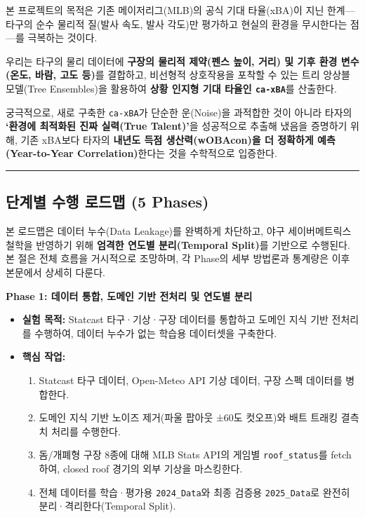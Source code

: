 \documentclass[
  11.5pt,
]{article}
\providecommand{\tightlist}{%
  \setlength{\itemsep}{0pt}\setlength{\parskip}{0pt}}
\begin{document}
본 프로젝트의 목적은 기존 메이저리그(MLB)의 공식 기대 타율(xBA)이 지닌
한계---타구의 순수 물리적 질(발사 속도, 발사 각도)만 평가하고 현실의
환경을 무시한다는 점---를 극복하는 것이다.

우리는 타구의 물리 데이터에 \textbf{구장의 물리적 제약(펜스 높이, 거리)
및 기후 환경 변수(온도, 바람, 고도 등)}를 결합하고, 비선형적 상호작용을
포착할 수 있는 트리 앙상블 모델(Tree Ensembles)을 활용하여 \textbf{상황
인지형 기대 타율인 \texttt{ca-xBA}}를 산출한다.

궁극적으로, 새로 구축한 \texttt{ca-xBA}가 단순한 운(Noise)을 과적합한
것이 아니라 타자의 \textbf{`환경에 최적화된 진짜 실력(True Talent)'}을
성공적으로 추출해 냈음을 증명하기 위해, 기존 xBA보다 타자의
\textbf{내년도 득점 생산력(wOBAcon)을 더 정확하게 예측(Year-to-Year
Correlation)}한다는 것을 수학적으로 입증한다.

\begin{center}\rule{0.5\linewidth}{0.5pt}\end{center}

\subsection{단계별 수행 로드맵 (5
Phases)}\label{uxb2e8uxacc4uxbcc4-uxc218uxd589-uxb85cuxb4dcuxb9f5-5-phases}

본 로드맵은 데이터 누수(Data Leakage)를 완벽하게 차단하고, 야구
세이버메트릭스 철학을 반영하기 위해 \textbf{엄격한 연도별 분리(Temporal
Split)}를 기반으로 수행된다. 본 절은 전체 흐름을 거시적으로 조망하며, 각
Phase의 세부 방법론과 통계량은 이후 본문에서 상세히 다룬다.

\textbf{Phase 1: 데이터 통합, 도메인 기반 전처리 및 연도별 분리}

\begin{itemize}
\tightlist
\item
  \textbf{실험 목적:} Statcast 타구·기상·구장 데이터를 통합하고 도메인
  지식 기반 전처리를 수행하여, 데이터 누수가 없는 학습용 데이터셋을
  구축한다.
\item
  \textbf{핵심 작업:}

  \begin{enumerate}
  \def\labelenumi{\arabic{enumi}.}
  \tightlist
  \item
    Statcast 타구 데이터, Open-Meteo API 기상 데이터, 구장 스펙 데이터를
    병합한다.
  \item
    도메인 지식 기반 노이즈 제거(파울 팝아웃 ±60도 컷오프)와 배트 트래킹
    결측치 처리를 수행한다.
  \item
    돔/개폐형 구장 8종에 대해 MLB Stats API의 게임별
    \texttt{roof\_status}를 fetch하여, closed roof 경기의 외부 기상을
    마스킹한다.
  \item
    전체 데이터를 학습·평가용 \texttt{2024\_Data}와 최종 검증용
    \texttt{2025\_Data}로 완전히 분리·격리한다(Temporal Split).
  \end{enumerate}
\end{itemize}
\end{document}
